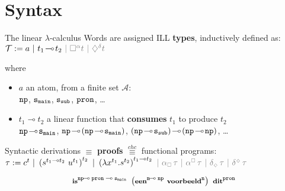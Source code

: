 \documentclass[aspectratio=169,handout]{beamer}
\newif\ifshowall %
\newcommand{\depBI}[1]{#1^{\scriptscriptstyle\Box}\,}
\newcommand{\depBE}[1]{#1_{\scriptscriptstyle\Box}\,}
\newcommand{\depDI}[1]{#1^{\scriptscriptstyle\diamondsuit}\,}
\newcommand{\depDE}[1]{#1_{\scriptscriptstyle\diamondsuit}\,}
\newcommand{\type}[1]{\ensuremath\mathtt{#1}}
\newcommand{\np}{\type{np}}
\newcommand{\n}{\type{n}}
\newcommand{\smain}{\type{s_{main}}}
\newcommand{\ssub}{\type{s_{sub}}}
\newcommand{\pron}{\type{pron}}
\newcommand{\li}{\!\multimap\!}
\begin{document}
\section{Syntax}

\ifshowall
\begin{frame}{The linear $\lambda$-calculus}
    Words are assigned ILL \textbf{types}, inductively defined as:
    $
        \mathcal{T} := a \ | \ t_1 \li t_2 \ 
        \textcolor{gray}{| \ \Box^\alpha t \ | \ \diamondsuit^\delta t}
    $
    
    where
    \begin{itemize}
    \item $a$ an atom, from a finite set $\mathcal{A}$:\\ 
    \quad\small{
        {$\np$, $\smain$, $\ssub$, $\pron$, \dots}
        }
    \item $t_1 \li t_2$ a linear function that \textbf{consumes} $t_1$ to produce $t_2$\\
        \quad\small{
            $\np \li \smain$, $\np \li (\np \li \smain)$,
            $(\np \li \ssub) \li (\np \li \np)$, \dots
        }
    \end{itemize}\vfill
    
    \pause
    Syntactic derivations $\equiv$ \textbf{proofs} $\overset{chc}{\equiv}$ functional programs:\\
    \hfill
    $
    \tau := c^{t} \ |
    \ \left( s^{t_1\multimap t_2}~ u^{t_1}\right)^{t_2} \ |
    \ \left( \lambda x^{t_1}.s^{t_2} \right)^{t_1 \multimap t_2} \ 
    \textcolor{gray}{
        | \ \depBE{\alpha} \tau \ | \ \depBI{\alpha} \tau \ | \ \depDE{\delta} \tau \ | \ \depDI{\delta} \tau
    }
    $\hfill 
    
    \vfill\pause
    \vspace{-10pt}
    \[
    \synt{is}^{\np\li~\pron~\li~\smain}~
        \left(
            \synt{een}^{\n\li~\np}
            ~
            \synt{voorbeeld}^{\n}
        \right)
        ~
        \synt{dit}^{\pron}
    \]    
    
    
\end{frame}
\end{document}
